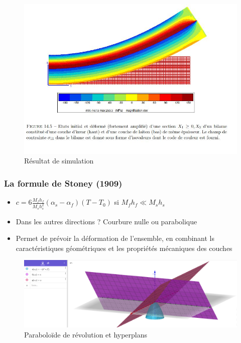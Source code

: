 \begin{frame}
    \begin{figure}
        \centering
        \includegraphics[scale=0.2]{imgs/deformation.JPG}
        \caption{Résultat de simulation}
    \end{figure}
    
\end{frame}



\begin{frame}
    \frametitle{La formule de Stoney (1909)}

    \begin{itemize}
        \item $c = 6\frac{M_fh_f}{M_sh_s^2}(\alpha_s-\alpha_f)(T-T_0)$ si $M_fh_f \ll M_sh_s$ 
        \item Dans les autres directions ? Courbure nulle ou parabolique
        \item Permet de prévoir la déformation de l'ensemble, en combinant ls caractéristiques géométriques et les propriétés mécaniques des couches
    \end{itemize}
    
    \begin{figure}
        \centering
        \includegraphics[scale=0.25]{imgs/courbes.png}
        \caption{Paraboloïde de révolution et hyperplans}
    \end{figure}
    
\end{frame}

